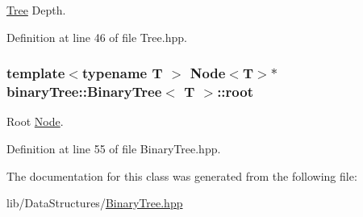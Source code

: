 \hyperlink{classtree_1_1Tree}{Tree} Depth. 



Definition at line 46 of file Tree.\-hpp.

\hypertarget{classbinaryTree_1_1BinaryTree_a4acdb7e36855c68a15a315ece7b6a6d3}{
\subsubsection[{root}]{\setlength{\rightskip}{0pt plus 5cm}template$<$typename T $>$ {\bf Node}$<$T$>$$\ast$ {\bf binary\-Tree\-::\-Binary\-Tree}$<$ T $>$\-::root\hspace{0.3cm}{\ttfamily [private]}}}\label{classbinaryTree_1_1BinaryTree_a4acdb7e36855c68a15a315ece7b6a6d3}


Root \hyperlink{structbinaryTree_1_1Node}{Node}. 



Definition at line 55 of file Binary\-Tree.\-hpp.



The documentation for this class was generated from the following file\-:\begin{DoxyCompactItemize}
\item 
lib/\-Data\-Structures/\hyperlink{BinaryTree_8hpp}{Binary\-Tree.\-hpp}\end{DoxyCompactItemize}
